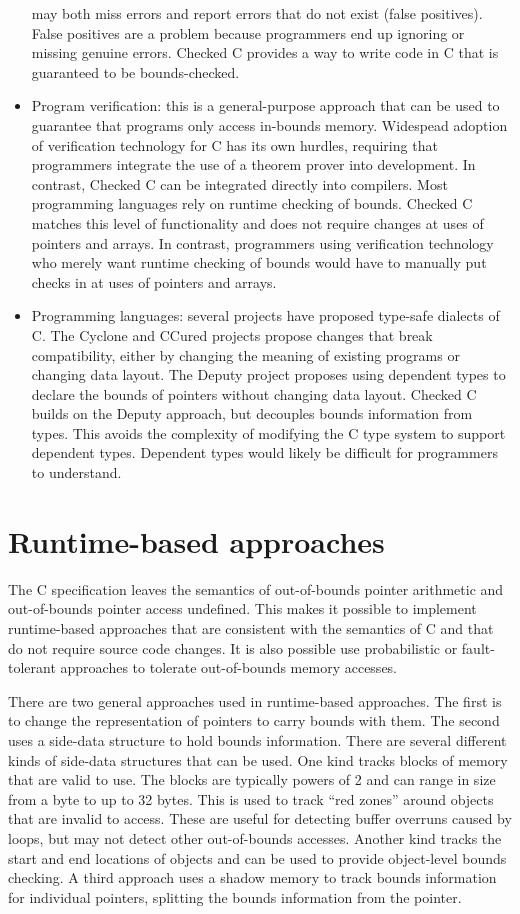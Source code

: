\begin{itemize}
may both miss errors and report errors that do not exist (false positives).
False positives are a problem because programmers end up ignoring or missing
genuine errors.  Checked C provides a way to write code in C that is guaranteed
to be bounds-checked.
\item Program verification: this is a general-purpose approach
that can be used to guarantee that programs only access in-bounds memory. 
Widespead adoption of verification technology for C has its own hurdles,
requiring that programmers integrate the use of a theorem prover into
development. In contrast, Checked C can be integrated directly into compilers.
Most programming languages rely on runtime checking of bounds.  Checked C
matches this level of functionality and does not require changes at uses of
pointers and arrays.  
In contrast, programmers using verification technology who merely want runtime
checking of bounds would have to manually put checks in at uses of pointers and arrays.
\item Programming languages: several projects have proposed type-safe 
dialects of C.  The Cyclone and CCured projects propose changes that
break compatibility, either by changing the meaning of existing programs
or changing data layout.  The Deputy project proposes using dependent types
to declare the bounds of pointers without changing data layout.  Checked C
builds on the Deputy approach, but decouples bounds information from types.
This avoids the complexity of modifying the C type system to support
dependent types.  Dependent types would likely be difficult for programmers to understand.
\end{itemize}

\section{Runtime-based approaches}

The C specification leaves the semantics of out-of-bounds pointer
arithmetic and out-of-bounds pointer access undefined.  This makes it possible 
to implement runtime-based approaches that are consistent with the semantics of
C and that do not require source code changes.   It is also possible
use probabilistic or fault-tolerant approaches to tolerate out-of-bounds
memory accesses.

There are two general approaches used in runtime-based approaches.
The first is to change the representation of pointers to carry
bounds with them.  The second uses a side-data structure to
hold bounds information.   There are several different kinds of side-data
structures that can be used.  One kind tracks blocks of memory that are valid to
use.  The blocks are typically powers of 2 and can range in size
from a byte to up to 32 bytes. This is used to track ``red zones'' around objects that
are invalid to access.  These are useful for detecting buffer overruns caused
by loops, but may not detect other out-of-bounds accesses.  Another kind tracks the
start and end locations of objects and can be used to provide object-level bounds checking.   A third approach uses a shadow memory to track bounds information for individual pointers, splitting the bounds information from the pointer.

